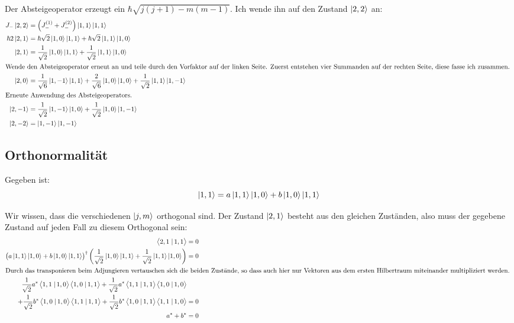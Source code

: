 Der Absteigeoperator erzeugt ein $\hbar \sqrt{j(j+1) - m(m-1)}$. Ich wende ihn
auf den Zustand $\left| 2, 2 \right\rangle$ an:
\begin{align*}
	J_- \ket{2, 2}
	&= \del{J_-^{(1)} + J_-^{(2)}} \ket{1, 1} \ket{1, 1} \\
	\hbar 2 \ket{2, 1}
	&= \hbar \sqrt 2 \ket{1, 0} \ket{1, 1} + \hbar \sqrt 2 \ket{1, 1} \ket{1, 0} \\
	\ket{2, 1}
	&= \frac1{\sqrt 2} \ket{1, 0} \ket{1, 1} + \frac1{\sqrt 2} \ket{1, 1} \ket{1, 0} \\
	\intertext{%
		Wende den Absteigeoperator erneut an und teile durch den Vorfaktor auf
		der linken Seite. Zuerst entstehen vier Summanden auf der rechten
		Seite, diese fasse ich zusammen.
	}
	\ket{2, 0}
	&= \frac1{\sqrt 6} \ket{1, -1} \ket{1, 1}
	+ \frac2{\sqrt 6} \ket{1, 0} \ket{1, 0}
	+ \frac1{\sqrt 2} \ket{1, 1} \ket{1, -1} \\
	\intertext{%
		Erneute Anwendung des Absteigeoperators.
	}
	\ket{2, -1}
	&= \frac1{\sqrt 2} \ket{1, -1} \ket{1, 0}
	+ \frac1{\sqrt 2} \ket{1, 0} \ket{1, -1} \\
	\ket{2, -2}
	&= \ket{1, -1} \ket{1, -1}
\end{align*}

\subsection{Orthonormalität}

Gegeben ist:
\[
	\left| 1, 1 \right\rangle = a \left| 1, 1 \right\rangle \left| 1, 0 \right\rangle + b \left| 1, 0 \right\rangle \left| 1, 1 \right\rangle
\]

Wir wissen, dass die verschiedenen $\left| j, m \right\rangle$ orthogonal sind. Der Zustand
$\left| 2, 1 \right\rangle$ besteht aus den gleichen Zuständen, also muss der gegebene Zustand
auf jeden Fall zu diesem Orthogonal sein:
\begin{align*}
	\braket{2, 1}{1, 1} &= 0 \\
	\del{a \ket{1, 1} \ket{1, 0} + b \ket{1, 0} \ket{1, 1}}^\dagger
	\del{\frac1{\sqrt 2} \ket{1, 0} \ket{1, 1} + \frac1{\sqrt 2} \ket{1, 1} \ket{1, 0}}
	&= 0 \\
	\intertext{%
		Durch das transponieren beim Adjungieren vertauschen sich die beiden
		Zustände, so dass auch hier nur Vektoren aus dem ersten Hilbertraum
		miteinander multipliziert werden.
	}
	\frac1{\sqrt2} a^* \braket{1, 1}{1, 0} \braket{1, 0}{1, 1}
	+ \frac1{\sqrt2} a^* \braket{1, 1}{1, 1} \braket{1, 0}{1, 0} \\
	+ \frac1{\sqrt2} b^* \braket{1, 0}{1, 0} \braket{1, 1}{1, 1}
	+ \frac1{\sqrt2} b^* \braket{1, 0}{1, 1} \braket{1, 1}{1, 0}
	&= 0 \\
	a^* + b^* &= 0
\end{align*}

